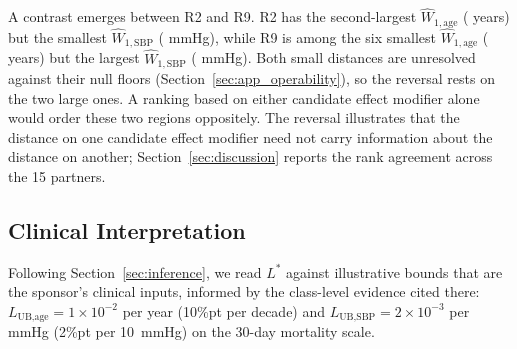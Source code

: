 \documentclass[AMA,Times1COL]{WileyNJDv5}
\begin{document}
A contrast emerges between R2 and R9. R2 has the second-largest $\widehat{W}_{1,\text{age}}$ ( years) but the smallest $\widehat{W}_{1,\text{SBP}}$ ( mmHg), while R9 is among the six smallest $\widehat{W}_{1,\text{age}}$ ( years) but the largest $\widehat{W}_{1,\text{SBP}}$ ( mmHg). Both small distances are unresolved against their null floors (Section~\ref{sec:app_operability}), so the reversal rests on the two large ones. A ranking based on either candidate effect modifier alone would order these two regions oppositely. The reversal illustrates that the distance on one candidate effect modifier need not carry information about the distance on another; Section~\ref{sec:discussion} reports the rank agreement across the 15 partners.

\subsection{Clinical Interpretation}\label{sec:app_clinical}

Following Section~\ref{sec:inference}, we read $L^*$ against illustrative bounds that are the sponsor's clinical inputs, informed by the class-level evidence cited there: $L_{\text{UB,age}} = 1\times10^{-2}$ per year (10\%pt per decade) and $L_{\text{UB,SBP}} = 2\times10^{-3}$ per mmHg (2\%pt per 10~mmHg) on the 30-day mortality scale.
\end{document}
